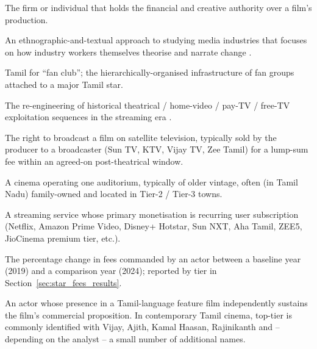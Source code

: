 \begin{description}[style=nextline,leftmargin=2.4em]
\item[Producer.]  The firm or individual that holds the financial
        and creative authority over a film's production.

\item[Production-cultures research.]  An ethnographic-and-textual
        approach to studying media industries that focuses on how
        industry workers themselves theorise and narrate change
        \citep{caldwell2008}.

\item[Rasikar mandram.]  Tamil for ``fan club''; the
        hierarchically-organised infrastructure of fan groups
        attached to a major Tamil star.

\item[Re-windowing.]  The re-engineering of historical theatrical /
        home-video / pay-TV / free-TV exploitation sequences in the
        streaming era \citep{cunningham2019}.

\item[Satellite rights.]  The right to broadcast a film on
        satellite television, typically sold by the producer to a
        broadcaster (Sun TV, KTV, Vijay TV, Zee Tamil) for a
        lump-sum fee within an agreed-on post-theatrical window.

\item[Single-screen.]  A cinema operating one auditorium, typically
        of older vintage, often (in Tamil Nadu) family-owned and
        located in Tier-2 / Tier-3 towns.

\item[Subscription Video On Demand (SVOD).]  A streaming service
        whose primary monetisation is recurring user subscription
        (Netflix, Amazon Prime Video, Disney+ Hotstar, Sun NXT,
        Aha Tamil, ZEE5, JioCinema premium tier, etc.).

\item[Star-fee adjustment.]  The percentage change in fees commanded
        by an actor between a baseline year (2019) and a comparison
        year (2024); reported by tier in
        Section~\ref{sec:star_fees_results}.

\item[Top-tier star.]  An actor whose presence in a Tamil-language
        feature film independently sustains the film's commercial
        proposition.  In contemporary Tamil cinema, top-tier is
        commonly identified with Vijay, Ajith, Kamal Haasan,
        Rajinikanth and -- depending on the analyst -- a small
        number of additional names.


\end{description}
